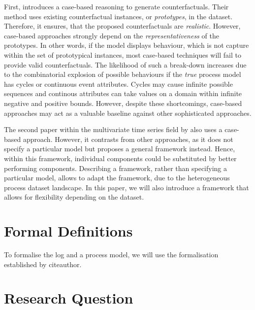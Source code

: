 \documentclass[12pt,a4paper]{report}
\begin{document}
First, \citeauthor{delaney_InstanceBasedCounterfactualExplanations_2021} introduces a case-based reasoning to generate counterfactuals. Their method uses existing counterfactual instances, or \emph{prototypes}, in the dataset. Therefore, it ensures, that the proposed counterfactuals are \emph{realistic}. However, case-based approaches strongly depend on the \emph{representativeness} of the prototypes\needscite. In other words, if the model displays behaviour, which is not capture within the set of prototypical instances, most case-based techniques will fail to provide valid counterfactuals. The likelihood of such a break-down increases due to the combinatorial explosion of possible behaviours if the \emph{true} process model has cycles or continuous event attributes. Cycles may cause infinite possible sequences and continous attributes can take values on a domain within infinite negative and positive bounds. However, despite these shortcomings, case-based approaches may act as a valuable baseline against other sophisticated approaches.

The second paper within the multivariate time series field by \citeauthor{ates_CounterfactualExplanationsMultivariate_2021} also uses a case-based approach. However, it contrasts from other approaches, as it does not specify a particular model but proposes a general framework instead. Hence, within this framework, individual components could be substituted by better performing components. Describing a framework, rather than specifying a particular model, allows to adapt the framework, due to the heterogeneous process dataset landscape. In this paper, we will also introduce a framework that allows for flexibility depending on the dataset. 




\section{Formal Definitions}
To formalise the log and a process model, we will use the formalisation established by citeauthor\needscite.

\section{Research Question}
\end{document}

